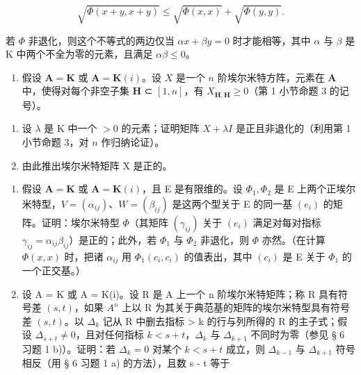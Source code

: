 \[
\sqrt {\Phi (x + y , x + y)} \leqslant \sqrt {\Phi (x , x)} + \sqrt {\Phi (y , y)}.
\]

若 \(\Phi\) 非退化，则这个不等式的两边仅当 \(\alpha x + \beta y = 0\) 时才能相等，其中 \(\alpha\) 与 \(\beta\) 是 K 中两个不全为零的元素，且满足 \(\alpha \beta \leqslant 0\)。

\begin{enumerate}
\def\labelenumi{\arabic{enumi})}
\setcounter{enumi}{1}
\tightlist
\item
  假设 \(\mathbf{A} = \mathbf{K}\) 或 \(\mathbf{A} = \mathbf{K}(i)\)。设 \(X\) 是一个 \(n\) 阶埃尔米特方阵，元素在 \(\mathbf{A}\) 中，使得对每个非空子集 \(\mathbf{H}\) ⊂ \([1, n]\)，有 \(X_{\mathbf{H},\mathbf{H}} \geqslant 0\)（第 1 小节命题 3 的记号）。
\end{enumerate}

\begin{enumerate}
\def\labelenumi{\alph{enumi})}
\item
  设 \(\lambda\) 是 K 中一个 \(>0\) 的元素；证明矩阵 \(X + \lambda I\) 是正且非退化的（利用第 1 小节命题 3，对 \(n\) 作归纳论证）。
\item
  由此推出埃尔米特矩阵 X 是正的。
\end{enumerate}

\begin{enumerate}
\def\labelenumi{\arabic{enumi})}
\setcounter{enumi}{2}
\item
  假设 \(\mathbf{A} = \mathbf{K}\) 或 \(\mathbf{A} = \mathbf{K}(i)\)，且 E 是有限维的。设 \(\Phi_1, \Phi_2\) 是 E 上两个正埃尔米特型，\(V = (\alpha_{ij})\)、\(W = (\beta_{ij})\) 是这两个型关于 E 的同一基 \((e_i)\) 的矩阵。证明：埃尔米特型 \(\Phi\)（其矩阵 \((\gamma_{ij})\) 关于 \((e_i)\) 满足对每对指标 \(\gamma_{ij} = \alpha_{ij}\beta_{ij}\)）是正的；此外，若 \(\Phi_1\) 与 \(\Phi_2\) 非退化，则 \(\Phi\) 亦然。（在计算 \(\Phi(x, x)\) 时，把诸 \(\alpha_{ij}\) 用 \(\Phi_1(c_i, c_i)\) 的值表出，其中 \((c_i)\) 是 E 关于 \(\Phi_1\) 的一个正交基。）
\item
  设 A = K 或 A = K(i)。设 R 是 A 上一个 n 阶埃尔米特矩阵；称 R 具有符号差 \((s, t)\)，如果 \(A^{n}\) 上以 R 为其关于典范基的矩阵的埃尔米特型具有符号差 \((s, t)\)。以 \(\Delta_{k}\) 记从 R 中删去指标 \textgreater{} k 的行与列所得的 R 的主子式；假设 \(\Delta_{s+t} \neq 0\)，且对任何指标 \(k < s + t\)，\(\Delta_{k}\) 与 \(\Delta_{k+1}\) 不同时为零（参见 § 6 习题 1 b)）。证明：若 \(\Delta_{k} = 0\) 对某个 \(k < s + t\) 成立，则 \(\Delta_{k-1}\) 与 \(\Delta_{k+1}\) 符号相反（用 § 6 习题 1 a) 的方法），且数 s - t 等于
\end{enumerate}

